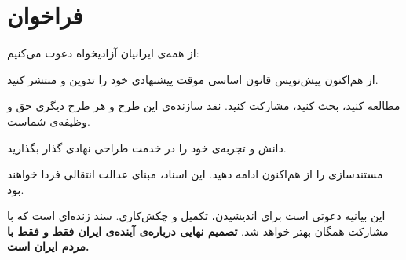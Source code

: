 \chapter{فراخوان}
\label{ch:call}

از همه‌ی ایرانیان آزادیخواه دعوت می‌کنیم:

\begin{infobox}[title={\rl{به جریان‌ها، احزاب و ائتلاف‌ها}}]
	از هم‌اکنون پیش‌نویس قانون اساسی موقت پیشنهادی خود را تدوین و منتشر کنید.
\end{infobox}

\begin{infobox}[title={\rl{به هر شهروند}}]
	مطالعه کنید، بحث کنید، مشارکت کنید. نقد سازنده‌ی این طرح و هر طرح دیگری حق و وظیفه‌ی شماست.
\end{infobox}

\begin{infobox}[title={\rl{به متخصصان}}]
	دانش و تجربه‌ی خود را در خدمت طراحی نهادی گذار بگذارید.
\end{infobox}

\begin{infobox}[title={\rl{به فعالان حقوق بشر}}]
	مستندسازی را از هم‌اکنون ادامه دهید. این اسناد، مبنای عدالت انتقالی فردا خواهند بود.
\end{infobox}

\begin{summarybox}
	این بیانیه دعوتی است برای اندیشیدن، تکمیل و چکش‌کاری. سند زنده‌ای است که با
	مشارکت همگان بهتر خواهد شد. \textbf{تصمیم نهایی درباره‌ی آینده‌ی ایران فقط و فقط
		با مردم ایران است.}
\end{summarybox}